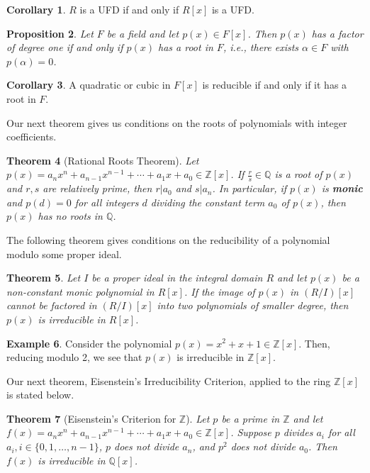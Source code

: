 \documentclass[10pt, oneside, reqno]{amsart}
\theoremstyle{plain}%
\newtheorem{thm}{Theorem}[section]
\newtheorem{prop}[thm]{Proposition}
\theoremstyle{definition}
\newtheorem{exmp}[thm]{Example}
\newtheorem{cor}[thm]{Corollary}
\theoremstyle{remark}
\newcommand{\al}{\alpha}
\newcommand{\Q}{\mathbb{Q}}
\newcommand{\Z}{\mathbb{Z}}
\begin{document}
\begin{cor}
	$R$ is a UFD if and only if $R[x]$ is a UFD.
\end{cor}


\begin{prop}
	Let $F$ be a field and let $p(x) \in F[x]$.  Then $p(x)$ has a factor of degree one if and only if $p(x)$ has a root in $F$, i.e., there exists $\al \in F$ with $p(\al) = 0$.
\end{prop}

\begin{cor}
	A quadratic or cubic in $F[x]$ is reducible if and only if it has a root in $F$.
\end{cor}

Our next theorem gives us conditions on the roots of polynomials with integer coefficients.

\begin{thm}[Rational Roots Theorem]
	Let $p(x) = a_n x^n + a_{n-1} x^{n-1} + \cdots + a_1 x + a_0 \in \Z[x]$.  If $\frac{r}{s} \in \Q$ is a root of $p(x)$ and $r,s$ are relatively prime, then $r | a_0$ and $s | a_n$.  In particular, if $p(x)$ is \textbf{monic} and $p(d) = 0$ for all integers $d$ dividing the constant term $a_0$ of $p(x)$, then $p(x)$ has no roots in $\Q$.
\end{thm}

The following theorem gives conditions on the reducibility of a polynomial modulo some proper ideal.

\begin{thm}
	Let $I$ be a proper ideal in the integral domain $R$ and let $p(x)$ be a non-constant monic polynomial in $R[x]$.  If the image of $p(x)$ in $(R/I)[x]$ cannot be factored in $(R/I)[x]$ into two polynomials of smaller degree, then $p(x)$ is irreducible in $R[x]$.
\end{thm}

\begin{exmp}
	Consider the polynomial $p(x) = x^2 + x + 1 \in \Z[x]$.  Then, reducing modulo 2, we see that $p(x)$ is irreducible in $\Z[x]$.
\end{exmp}

Our next theorem, Eisenstein's Irreducibility Criterion, applied to the ring $\Z[x]$ is stated below.

\begin{thm}[Eisenstein's Criterion for $\Z$]
	
	Let $p$ be a prime in $\Z$ and let $f(x) = a_n x^n + a_{n-1}x^{n-1} + \cdots + a_1 x + a_0 \in \Z[x]$. Suppose $p$ divides $a_i$ for all $a_i, i \in \{0, 1, \dots, n-1 \}$, $p$ does not divide $a_n$, and $p^2$ does not divide $a_0$.  Then $f(x)$ is irreducible in $\Q[x]$.
\end{thm}
\end{document}
